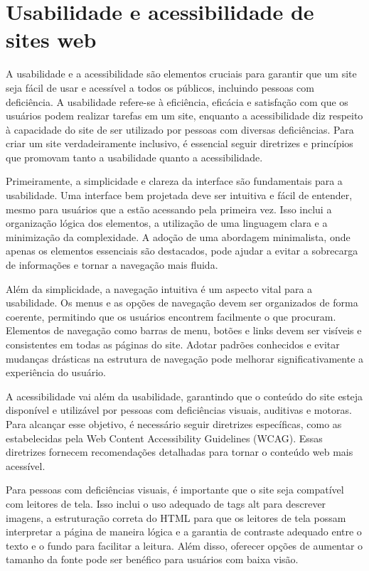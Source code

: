 \section{Usabilidade e acessibilidade de sites web}

A usabilidade e a acessibilidade são elementos cruciais para garantir que um site seja fácil de usar e acessível a todos os públicos, incluindo pessoas com deficiência. A usabilidade refere-se à eficiência, eficácia e satisfação com que os usuários podem realizar tarefas em um site, enquanto a acessibilidade diz respeito à capacidade do site de ser utilizado por pessoas com diversas deficiências. Para criar um site verdadeiramente inclusivo, é essencial seguir diretrizes e princípios que promovam tanto a usabilidade quanto a acessibilidade.

Primeiramente, a simplicidade e clareza da interface são fundamentais para a usabilidade. Uma interface bem projetada deve ser intuitiva e fácil de entender, mesmo para usuários que a estão acessando pela primeira vez. Isso inclui a organização lógica dos elementos, a utilização de uma linguagem clara e a minimização da complexidade. A adoção de uma abordagem minimalista, onde apenas os elementos essenciais são destacados, pode ajudar a evitar a sobrecarga de informações e tornar a navegação mais fluida.

Além da simplicidade, a navegação intuitiva é um aspecto vital para a usabilidade. Os menus e as opções de navegação devem ser organizados de forma coerente, permitindo que os usuários encontrem facilmente o que procuram. Elementos de navegação como barras de menu, botões e links devem ser visíveis e consistentes em todas as páginas do site. Adotar padrões conhecidos e evitar mudanças drásticas na estrutura de navegação pode melhorar significativamente a experiência do usuário.

A acessibilidade vai além da usabilidade, garantindo que o conteúdo do site esteja disponível e utilizável por pessoas com deficiências visuais, auditivas e motoras. Para alcançar esse objetivo, é necessário seguir diretrizes específicas, como as estabelecidas pela Web Content Accessibility Guidelines (WCAG). Essas diretrizes fornecem recomendações detalhadas para tornar o conteúdo web mais acessível.

Para pessoas com deficiências visuais, é importante que o site seja compatível com leitores de tela. Isso inclui o uso adequado de tags alt para descrever imagens, a estruturação correta do HTML para que os leitores de tela possam interpretar a página de maneira lógica e a garantia de contraste adequado entre o texto e o fundo para facilitar a leitura. Além disso, oferecer opções de aumentar o tamanho da fonte pode ser benéfico para usuários com baixa visão.

